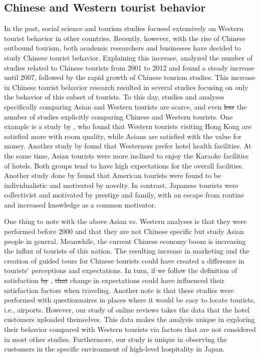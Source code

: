 \documentclass[smallextended,natbib]{svjour3}       %
\providecommand{\DIFadd}[1]{{\protect\color{blue}\uwave{#1}}} %
\providecommand{\DIFdel}[1]{{\protect\color{red}\sout{#1}}}                      %
\providecommand{\DIFaddbegin}{} %
\providecommand{\DIFaddend}{} %
\providecommand{\DIFdelbegin}{} %
\providecommand{\DIFdelend}{} %
\newcommand{\DIFscaledelfig}{0.5}
\newlength{\DIFdelgraphicswidth} %
\newlength{\DIFdelgraphicsheight} %
\newcommand{\DIFaddincludegraphics}[2][]{{\color{blue}\fbox{\DIFOincludegraphics[#1]{#2}}}} %
\newcommand{\DIFdelincludegraphics}[2][]{%
\sbox{\DIFdelgraphicsbox}{\DIFOincludegraphics[#1]{#2}}%
\settoboxwidth{\DIFdelgraphicswidth}{\DIFdelgraphicsbox} %
\settoboxtotalheight{\DIFdelgraphicsheight}{\DIFdelgraphicsbox} %
\scalebox{\DIFscaledelfig}{%
\parbox[b]{\DIFdelgraphicswidth}{\usebox{\DIFdelgraphicsbox}\\[-\baselineskip] \rule{\DIFdelgraphicswidth}{0em}}\llap{\resizebox{\DIFdelgraphicswidth}{\DIFdelgraphicsheight}{%
\setlength{\unitlength}{\DIFdelgraphicswidth}%
\begin{picture}(1,1)%
\thicklines\linethickness{2pt} %
{\color[rgb]{1,0,0}\put(0,0){\framebox(1,1){}}}%
{\color[rgb]{1,0,0}\put(0,0){\line( 1,1){1}}}%
{\color[rgb]{1,0,0}\put(0,1){\line(1,-1){1}}}%
\end{picture}%
}\hspace*{3pt}}} %
} %
\DeclareRobustCommand{\DIFaddbegin}{\DIFOaddbegin \let\includegraphics\DIFaddincludegraphics} %
\DeclareRobustCommand{\DIFaddend}{\DIFOaddend \let\includegraphics\DIFOincludegraphics} %
\DeclareRobustCommand{\DIFdelbegin}{\DIFOdelbegin \let\includegraphics\DIFdelincludegraphics} %
\DeclareRobustCommand{\DIFdelend}{\DIFOaddend \let\includegraphics\DIFOincludegraphics} %
\begin{document}
  \subsection{Chinese and Western tourist behavior}\label{theory_zh_en}

    In the past, social science and tourism studies focused extensively on Western tourist behavior in other countries. Recently, however, with the rise of Chinese outbound tourism, both academic researchers and businesses have decided to study Chinese tourist behavior. Explaining this increase, \cite{sun2017} analyzed the number of studies related to Chinese tourists from 2001 to 2012 and found a steady increase until 2007, followed by the rapid growth of Chinese tourism studies. This increase in Chinese tourist behavior research resulted in several studies focusing on only the behavior of this subset of tourists. To this day, studies and analyses specifically comparing Asian and Western tourists are scarce, and even \DIFdelbegin \DIFdel{less }\DIFdelend \DIFaddbegin \DIFadd{fewer are }\DIFaddend the number of studies explicitly comparing Chinese and Western tourists. One example is a study by \cite{choi2000}, who found that Western tourists visiting Hong Kong are satisfied more with room quality, while Asians are satisfied with the value for money. Another study by \cite{bauer1993changing} found that Westerners prefer hotel health facilities. At the same time, Asian tourists were more inclined to enjoy the Karaoke facilities of hotels. Both groups tend to have high expectations for the overall facilities. Another study done by \cite{kim2000} found that American tourists were found to be individualistic and motivated by novelty. In contrast, Japanese tourists were collectivist and motivated by prestige and family, with an escape from routine and increased knowledge as a common motivator. 

    One thing to note with the above Asian vs. Western analyses is that they were performed before 2000 and that they are not Chinese specific but study Asian people in general. Meanwhile, the current Chinese economy boom is increasing the influx of tourists of this nation. The resulting increase in marketing and the creation of guided tours for Chinese tourists could have created a difference in tourists' perceptions and expectations. In turn, if we follow the definition of satisfaction \DIFdelbegin \DIFdel{by }\DIFdelend \DIFaddbegin \DIFadd{in }\DIFaddend \cite{hunt1975}, \DIFdelbegin \DIFdel{that }\DIFdelend \DIFaddbegin \DIFadd{then }\DIFaddend change in expectations could have influenced their satisfaction factors when traveling. Another note is that these studies were performed with questionnaires in places where it would be easy to locate tourists, i.e., airports. However, our study of online reviews takes the data that the hotel customers uploaded themselves. This data makes the analysis unique in exploring their behavior compared with Western tourists via factors that are not considered in most other studies. Furthermore, our study is unique in observing the customers in the specific environment of high-level hospitality in Japan.
\end{document}
